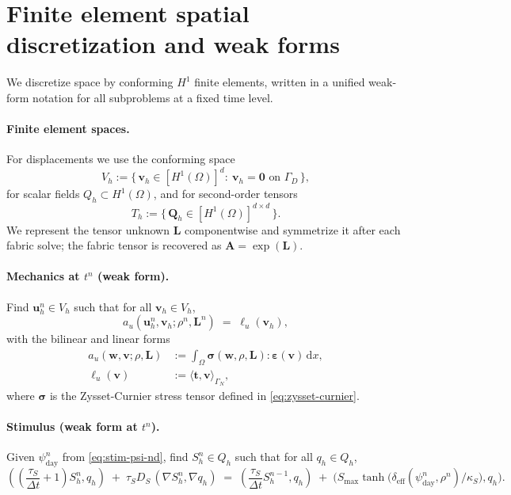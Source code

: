 \section*{Finite element spatial discretization and weak forms}
\label{sec:fe-space}
We discretize space by conforming $H^1$ finite elements, written in a unified weak-form notation for all subproblems at a fixed time level.

\paragraph{Finite element spaces.}
For displacements we use the conforming space
\[
V_h:=\{\,\mathbf{v}_h\in [H^1(\Omega)]^d:\ \mathbf{v}_h=\mathbf{0}\text{ on }\Gamma_D\,\},
\]
for scalar fields $Q_h\subset H^1(\Omega)$, and for second-order tensors
\[
T_h:=\{\,\mathbf{Q}_h\in [H^1(\Omega)]^{d\times d}\,\}.
\]
We represent the tensor unknown $\mathbf{L}$ componentwise and symmetrize it after each fabric solve; the fabric tensor is recovered as $\mathbf{A}=\exp(\mathbf{L})$.

\paragraph{Mechanics at $t^n$ (weak form).}
Find $\mathbf{u}_h^{n}\in V_h$ such that for all $\mathbf{v}_h\in V_h$,
\begin{equation}\label{eq:fe-mech-unified}
a_u(\mathbf{u}_h^{n},\mathbf{v}_h;\rho^{n},\mathbf{L}^{n}) \;=\; \ell_u(\mathbf{v}_h),
\end{equation}
with the bilinear and linear forms
\begin{align*}
a_u(\mathbf{w},\mathbf{v};\rho,\mathbf{L})
&:= \int_\Omega \boldsymbol{\sigma}(\mathbf{w}, \rho, \mathbf{L}) : \boldsymbol{\varepsilon}(\mathbf{v}) \, \mathrm{d}x, \\[2mm]
\ell_u(\mathbf{v}) &:= \langle \mathbf{t},\mathbf{v} \rangle_{\Gamma_N},
\end{align*}
where $\boldsymbol{\sigma}$ is the Zysset-Curnier stress tensor defined in \eqref{eq:zysset-curnier}.

\paragraph{Stimulus (weak form at $t^n$).}
Given $\psi_{\mathrm{day}}^{n}$ from \eqref{eq:stim-psi-nd}, find $S_h^{n}\in Q_h$ such that for all $q_h\in Q_h$,
\begin{equation}\label{eq:fe-stim-unified}
\left(\left(\frac{\tau_S}{\Delta t}+1\right) S_h^{n}, q_h\right) \;+\; \tau_S D_S\,(\nabla S_h^{n}, \nabla q_h)
\;=\; \left(\frac{\tau_S}{\Delta t} S_h^{n-1}, q_h\right) \;+\; \Big(S_{\max}\tanh\!\big(\delta_{\mathrm{eff}}(\psi_{\mathrm{day}}^{n},\rho^{n})/\kappa_S\big), q_h\Big).
\end{equation}

